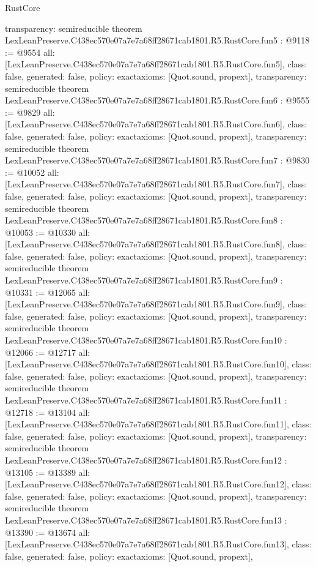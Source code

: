 \begin{lexlean}{RustCore}
\begin{coremodule}
{  transparency: semireducible
}
theorem LexLeanPreserve.C438ec570e07a7e7a68ff28671cab1801.R5.RustCore.fun5 : @9118 := @9554 {
  all: [LexLeanPreserve.C438ec570e07a7e7a68ff28671cab1801.R5.RustCore.fun5],
  class: false,
  generated: false,
  policy: exact{axioms: [Quot.sound, propext]},
  transparency: semireducible
}
theorem LexLeanPreserve.C438ec570e07a7e7a68ff28671cab1801.R5.RustCore.fun6 : @9555 := @9829 {
  all: [LexLeanPreserve.C438ec570e07a7e7a68ff28671cab1801.R5.RustCore.fun6],
  class: false,
  generated: false,
  policy: exact{axioms: [Quot.sound, propext]},
  transparency: semireducible
}
theorem LexLeanPreserve.C438ec570e07a7e7a68ff28671cab1801.R5.RustCore.fun7 : @9830 := @10052 {
  all: [LexLeanPreserve.C438ec570e07a7e7a68ff28671cab1801.R5.RustCore.fun7],
  class: false,
  generated: false,
  policy: exact{axioms: [Quot.sound, propext]},
  transparency: semireducible
}
theorem LexLeanPreserve.C438ec570e07a7e7a68ff28671cab1801.R5.RustCore.fun8 : @10053 := @10330 {
  all: [LexLeanPreserve.C438ec570e07a7e7a68ff28671cab1801.R5.RustCore.fun8],
  class: false,
  generated: false,
  policy: exact{axioms: [Quot.sound, propext]},
  transparency: semireducible
}
theorem LexLeanPreserve.C438ec570e07a7e7a68ff28671cab1801.R5.RustCore.fun9 : @10331 := @12065 {
  all: [LexLeanPreserve.C438ec570e07a7e7a68ff28671cab1801.R5.RustCore.fun9],
  class: false,
  generated: false,
  policy: exact{axioms: [Quot.sound, propext]},
  transparency: semireducible
}
theorem LexLeanPreserve.C438ec570e07a7e7a68ff28671cab1801.R5.RustCore.fun10 : @12066 := @12717 {
  all: [LexLeanPreserve.C438ec570e07a7e7a68ff28671cab1801.R5.RustCore.fun10],
  class: false,
  generated: false,
  policy: exact{axioms: [Quot.sound, propext]},
  transparency: semireducible
}
theorem LexLeanPreserve.C438ec570e07a7e7a68ff28671cab1801.R5.RustCore.fun11 : @12718 := @13104 {
  all: [LexLeanPreserve.C438ec570e07a7e7a68ff28671cab1801.R5.RustCore.fun11],
  class: false,
  generated: false,
  policy: exact{axioms: [Quot.sound, propext]},
  transparency: semireducible
}
theorem LexLeanPreserve.C438ec570e07a7e7a68ff28671cab1801.R5.RustCore.fun12 : @13105 := @13389 {
  all: [LexLeanPreserve.C438ec570e07a7e7a68ff28671cab1801.R5.RustCore.fun12],
  class: false,
  generated: false,
  policy: exact{axioms: [Quot.sound, propext]},
  transparency: semireducible
}
theorem LexLeanPreserve.C438ec570e07a7e7a68ff28671cab1801.R5.RustCore.fun13 : @13390 := @13674 {
  all: [LexLeanPreserve.C438ec570e07a7e7a68ff28671cab1801.R5.RustCore.fun13],
  class: false,
  generated: false,
  policy: exact{axioms: [Quot.sound, propext]},
}
\end{coremodule}
\end{lexlean}

